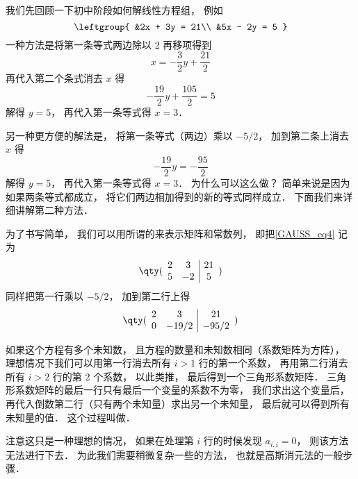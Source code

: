 \begin{exam}{}\label{GAUSS_ex1}
我们先回顾一下初中阶段如何解线性方程组， 例如
\begin{equation}\label{GAUSS_eq4}
\leftgroup{
&2x + 3y = 21\\
&5x - 2y = 5
}\end{equation}
一种方法是将第一条等式两边除以 2 再移项得到
\begin{equation}
x = - \frac32 y + \frac{21}{2}
\end{equation}
再代入第二个条式消去 $x$ 得
\begin{equation}
-\frac{19}{2} y + \frac{105}{2} = 5
\end{equation}
解得 $y = 5$， 再代入第一条等式得 $x = 3$．

另一种更方便的解法是， 将第一条等式（两边）乘以 $-5/2$， 加到第二条上消去 $x$ 得
\begin{equation}
-\frac{19}{2} y = -\frac{95}{2}
\end{equation}
解得 $y = 5$， 再代入第一条等式得 $x = 3$． 为什么可以这么做？  简单来说是因为如果两条等式都成立， 将它们两边相加得到的新的等式同样成立． 下面我们来详细讲解第二种方法．

为了书写简单， 我们可以用所谓的来表示矩阵和常数列， 即把\autoref{GAUSS_eq4} 记为
\begin{equation}
\qty( \begin{array}{cc|c}
	2 & 3 & 21 \\
	5 & -2 & 5
	\end{array} 
)\end{equation}
同样把第一行乘以 $-5/2$， 加到第二行上得
\begin{equation}
\qty( \begin{array}{cc|c}
	2 & 3 & 21 \\
	0 & -19/2 & -95/2
	\end{array} 
)\end{equation}

如果这个方程有多个未知数， 且方程的数量和未知数相同（系数矩阵为方阵）， 理想情况下我们可以用第一行消去所有 $i > 1$ 行的第一个系数， 再用第二行消去所有 $i > 2$ 行的第 2 个系数， 以此类推， 最后得到一个三角形系数矩阵． 三角形系数矩阵的最后一行只有最后一个变量的系数不为零， 我们求出这个变量后， 再代入倒数第二行（只有两个未知量）求出另一个未知量， 最后就可以得到所有未知量的值． 这个过程叫做．%

注意这只是一种理想的情况， 如果在处理第 $i$ 行的时候发现 $a_{i,i} = 0$， 则该方法无法进行下去． 为此我们需要稍微复杂一些的方法， 也就是高斯消元法的一般步骤．
\end{exam}

